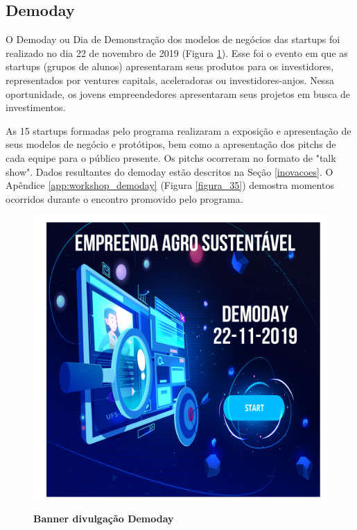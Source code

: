 \subsection{Demoday}

O Demoday ou Dia de Demonstração dos modelos de negócios das startups foi realizado no dia 22 de novembro de 2019 (Figura \ref{divulgacao_demoday}). Esse foi o evento em que as startups (grupos de alunos) apresentaram seus produtos para os investidores, representados por ventures capitals, aceleradoras ou investidores-anjos. Nessa oportunidade, os jovens empreendedores apresentaram seus projetos em busca de investimentos.

As 15 startups formadas pelo programa realizaram a exposição e apresentação de seus modelos de negócio e protótipos, bem como a apresentação dos pitchs de cada equipe para o público presente. Os pitchs ocorreram no formato de "talk show". Dados resultantes do demoday estão descritos na Seção \ref{inovacoes}. 
O Apêndice \ref{app:workshop_demoday} (Figura \ref{figura_35}) demostra momentos ocorridos durante o encontro promovido pelo programa.



\begin{figure}[H]
\centering
\caption{\textbf{Banner divulgação Demoday}}
\includegraphics[scale=0.4]{Imagens/demoday_banner.png}
\label{divulgacao_demoday}
\end{figure}

